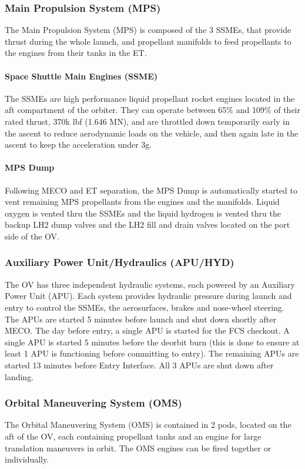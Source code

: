 \documentclass[Space_Shuttle_Vessel_Manual.tex]{subfiles}
\begin{document}
\begin{multicols*}{2}
\subsubsection{Main Propulsion System (MPS)}
The Main Propulsion System (MPS) is composed of the 3 SSMEs, that provide thrust during the whole launch, and propellant manifolds to feed propellants to the engines from their tanks in the ET.
\paragraph{Space Shuttle Main Engines (SSME)}
The SSMEs are high performance liquid propellant rocket engines located in the aft compartment of the orbiter. They can operate between 65\% and 109\% of their rated thrust, 370k lbf (1.646 MN), and are throttled down temporarily early in the ascent to reduce aerodynamic loads on the vehicle, and then again late in the ascent to keep the acceleration under 3g.
\paragraph{MPS Dump}
Following MECO and ET separation, the MPS Dump is automatically started to vent remaining MPS propellants from the engines and the manifolds. Liquid oxygen is vented thru the SSMEs and the liquid hydrogen is vented thru the backup LH2 dump valves and the LH2 fill and drain valves located on the port side of the OV.


\subsubsection{Auxiliary Power Unit/Hydraulics (APU/HYD)}
The OV has three independent hydraulic systems, each powered by an Auxiliary Power Unit (APU). Each system provides hydraulic pressure during launch and entry to control the SSMEs, the aerosurfaces, brakes and nose-wheel steering.\\
The APUs are started 5 minutes before launch and shut down shortly after MECO. The day before entry, a single APU is started for the FCS checkout. A single APU is started 5 minutes before the deorbit burn (this is done to ensure at least 1 APU is functioning before committing to entry). The remaining APUs are started 13 minutes before Entry Interface. All 3 APUs are shut down after landing.


\subsubsection{Orbital Maneuvering System (OMS)}
The Orbital Maneuvering System (OMS) is contained in 2 pods, located on the aft of the OV, each containing propellant tanks and an engine for large translation maneuvers in orbit. The OMS engines can be fired together or individually.



\end{multicols*}
\end{document}
